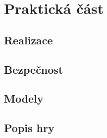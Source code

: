 \chapter{Praktická část}


\section{Realizace}





\section{Bezpečnost}


\section{Modely}


\section{Popis hry}

